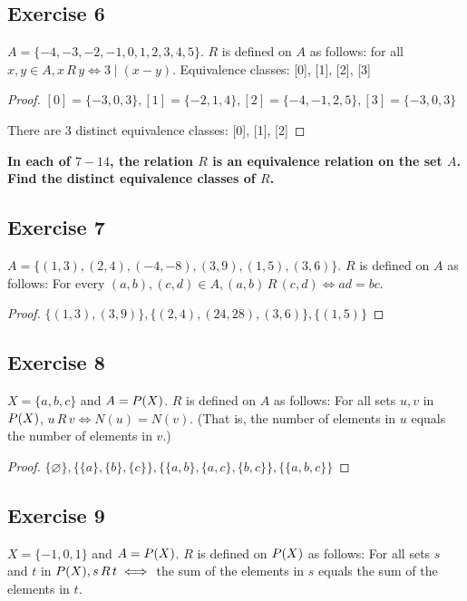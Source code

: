 \documentclass[14pt]{extarticle}
\let\mathscr\relax
\newcommand{\ps}{\mathscr{P}} %
\newcommand{\es}{\varnothing}
\newcommand{\cy}{\color{cyan}}
\begin{document}
\subsection{Exercise 6}
\(A = \{-4, -3, -2, -1, 0, 1, 2, 3, 4, 5\}\). \(R\) is defined on \(A\) as follows: for all \(x, y \in A, x \,R\,
y \iff 3 \mid (x - y)\). Equivalence classes: [0], [1], [2], [3]

\begin{proof}
        \([0] = \{-3, 0, 3\}, [1] = \{-2, 1, 4\}, [2] = \{-4, -1, 2, 5\}, [3] = \{-3, 0, 3\}\)

        There are 3 distinct equivalence classes: [0], [1], [2]
\end{proof}

{\bf \cy In each of $7-14$, the relation $R$ is an equivalence relation on the set $A$. Find the distinct
equivalence classes of $R$.}

\subsection{Exercise 7}
\(A = \{(1, 3), (2, 4), (-4, -8), (3, 9), (1, 5), (3, 6)\}\). \(R\) is defined on \(A\) as follows: For every
\((a, b), (c, d) \in A, (a, b) \, R \, (c, d) \iff ad = bc\).

\begin{proof}
        \(\{(1, 3), (3, 9)\}, \{(2, 4), (24, 28), (3, 6)\}, \{(1, 5)\}\)
\end{proof}

\subsection{Exercise 8}
\(X = \{a, b, c\}\) and \(A = \ps(X)\). \(R\) is defined on \(A\) as follows: For all sets \(u, v\) in \(\ps(X)\),
\(u\, R\, v \iff N(u) = N(v)\). (That is, the number of elements in $u$ equals the number of elements in $v$.)

\begin{proof}
        \(\{\es\}, \{\{a\}, \{b\}, \{c\}\}, \{\{a, b\}, \{a, c\}, \{b, c\}\}, \{\{a, b, c\}\}\)
\end{proof}

\subsection{Exercise 9}
\(X = \{-1, 0, 1\}\) and \(A = \ps(X)\). \(R\) is defined on \(\ps(X)\) as follows: For all sets $s$ and $t$ in
\(\ps(X), s \, R\, t \iff\) the sum of the elements in $s$
equals the sum of the elements in $t$.
\end{document}
